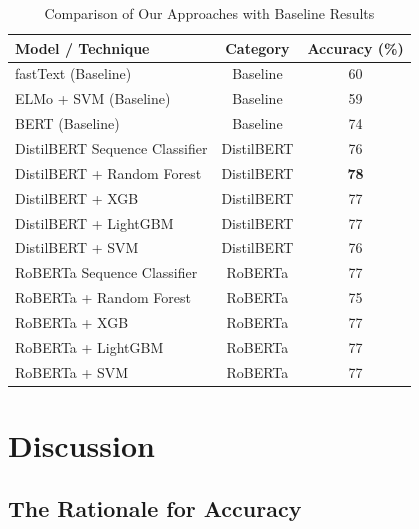 \documentclass[sigconf,review]{acmart}
\begin{document}


\begin{table}[b]
  \caption{Comparison of Our Approaches with Baseline Results}
  \label{tab:results_merged}
  \begin{tabular}{lcc}
    \toprule
    Model / Technique & Category & Accuracy (\%) \\
    \midrule
    fastText (Baseline) & Baseline & 60 \\
    ELMo + SVM (Baseline) & Baseline & 59 \\
    BERT (Baseline) & Baseline & 74 \\
    \midrule
    DistilBERT Sequence Classifier & DistilBERT & 76 \\
    DistilBERT + Random Forest & DistilBERT & \textbf{78} \\
    DistilBERT + XGB & DistilBERT & 77 \\
    DistilBERT + LightGBM & DistilBERT & 77 \\
    DistilBERT + SVM & DistilBERT & 76 \\
    \midrule
    RoBERTa Sequence Classifier & RoBERTa & 77 \\
    RoBERTa + Random Forest & RoBERTa & 75 \\
    RoBERTa + XGB & RoBERTa & 77 \\
    RoBERTa + LightGBM & RoBERTa & 77 \\
    RoBERTa + SVM & RoBERTa & 77 \\
    \bottomrule
  \end{tabular}
\end{table}


\section{Discussion}
\label{Discussion}

\subsection{The Rationale for Accuracy}
\end{document}

